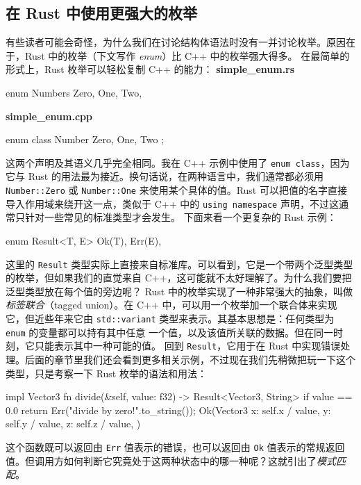 \subsection{在 Rust 中使用更强大的枚举}
\label{idx:idx_a1c04fed}
\label{idx:idx_44699645}
\label{idx:idx_d0a2d652}
有些读者可能会奇怪，为什么我们在讨论结构体语法时没有一并讨论枚举。原因在于，Rust 中的枚举（下文写作 \emph{enum}）比 C++ 中的枚举强大得多。
在最简单的形式上，Rust 枚举可以轻松复制 C++ 的能力：
\textbf{simple\_\allowbreak{}enum.\allowbreak{}rs}
\begin{codebox}[rust]
enum Numbers {
    Zero,
    One,
    Two,
}
\end{codebox}
\textbf{simple\_\allowbreak{}enum.\allowbreak{}cpp}
\begin{codebox}[rust]
enum class Number {
    Zero,
    One,
    Two
};
\end{codebox}
这两个声明及其语义几乎完全相同。我在 C++ 示例中使用了 \texttt{enum class}，因为它与 Rust 的用法最为接近。换句话说，在两种语言中，我们通常都必须用 \texttt{Number::\allowbreak{}Zero} 或 \texttt{Number::One} 来使用某个具体的值。Rust 可以把值的名字直接导入作用域来绕开这一点，类似于 C++ 中的 \texttt{using namespace} 声明，不过这通常只针对一些常见的标准类型才会发生。
\label{idx:idx_be4c963c}
下面来看一个更复杂的 Rust 示例：
\begin{codebox}[rust]
enum Result<T, E> {
    Ok(T),
    Err(E),
}
\end{codebox}
\label{idx:idx_260c7f1c}
\label{idx:idx_e5a120a7}
这里的 \texttt{Result} 类型实际上直接来自标准库。可以看到，它是一个带两个泛型类型的枚举，但如果我们的直觉来自 C++，这可能就不太好理解了。为什么我们要把泛型类型放在每个值的旁边呢？
Rust 中的枚举实现了一种非常强大的抽象，叫做\emph{标签联合}（tagged union）。在 C++ 中，可以用一个枚举加一个联合体来实现它，但近些年来它由
\texttt{std::\allowbreak{}variant} 类型来表示。其基本思想是：任何类型为 \texttt{enum} 的变量都可以持有其中任意
一个值，以及该值所关联的数据。但在同一时刻，它只能表示其中一种可能的值。
回到 \texttt{Result}，它用于在 Rust 中实现错误处理。后面的章节里我们还会看到更多相关示例，不过现在我们先稍微把玩一下这个类型，只是考察一下 Rust 枚举的语法和用法：
\begin{codebox}[rust]
impl Vector3 {
    fn divide(&self, value: f32)
        -> Result<Vector3, String> {
        if value == 0.0 {
            return Err("divide by zero!".to_string());
        }
        Ok(Vector3 {
            x: self.x / value,
            y: self.y / value,
            z: self.z / value,
        })
    }
}
\end{codebox}
\label{idx:idx_65c607f3}
\label{idx:idx_de227c0b}
\label{idx:idx_290e884e}
这个函数既可以返回由 \texttt{Err} 值表示的错误，也可以返回由 \texttt{Ok} 值表示的常规返回值。但调用方如何判断它究竟处于这两种状态中的哪一种呢？这就引出了\emph{模式匹配}。
